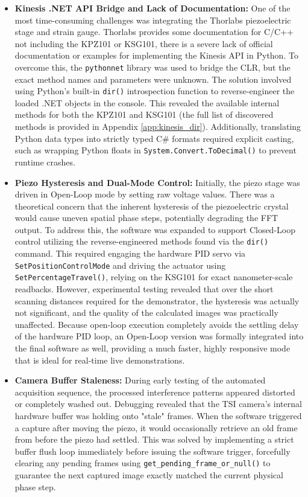 \documentclass[12pt,a4paper]{article}
\begin{document}
            \begin{itemize}
                \item \textbf{Kinesis .NET API Bridge and Lack of Documentation:} 
                One of the most time-consuming challenges was integrating the Thorlabs piezoelectric stage and strain gauge. Thorlabs provides some documentation for C/C++ not including the \ac{KPZ101} or \ac{KSG101}, there is a severe lack of official documentation or examples for implementing the Kinesis API in Python. To overcome this, the \texttt{pythonnet} library was used to bridge the \ac{CLR}, but the exact method names and parameters were unknown. The solution involved using Python's built-in \texttt{dir()} introspection function to reverse-engineer the loaded .NET objects in the console. This revealed the available internal methods for both the \ac{KPZ101} and \ac{KSG101} (the full list of discovered methods is provided in Appendix \ref{app:kinesis_dir}). Additionally, translating Python data types into strictly typed C\# formats required explicit casting, such as wrapping Python floats in \texttt{System.Convert.ToDecimal()} to prevent runtime crashes.

                \item \textbf{Piezo Hysteresis and Dual-Mode Control:}
                Initially, the piezo stage was driven in Open-Loop mode by setting raw voltage values. There was a theoretical concern that the inherent hysteresis of the piezoelectric crystal would cause uneven spatial phase steps, potentially degrading the \ac{FFT} output. To address this, the software was expanded to support Closed-Loop control utilizing the reverse-engineered methods found via the \texttt{dir()} command. This required engaging the hardware PID servo via \texttt{SetPositionControlMode} and driving the actuator using \texttt{SetPercentageTravel()}, relying on the KSG101 for exact nanometer-scale readbacks. However, experimental testing revealed that over the short scanning distances required for the demonstrator, the hysteresis was actually not significant, and the quality of the calculated images was practically unaffected. Because open-loop execution completely avoids the settling delay of the hardware PID loop, an Open-Loop version was formally integrated into the final software as well, providing a much faster, highly responsive mode that is ideal for real-time live demonstrations.

                \item \textbf{Camera Buffer Staleness:}
                During early testing of the automated acquisition sequence, the processed interference patterns appeared distorted or completely washed out. Debugging revealed that the \ac{TSI} camera's internal hardware buffer was holding onto "stale" frames. When the software triggered a capture after moving the piezo, it would occasionally retrieve an old frame from before the piezo had settled. This was solved by implementing a strict buffer flush loop immediately before issuing the software trigger, forcefully clearing any pending frames using \texttt{get\_pending\_frame\_or\_null()} to guarantee the next captured image exactly matched the current physical phase step.


\end{itemize}
\end{document}
